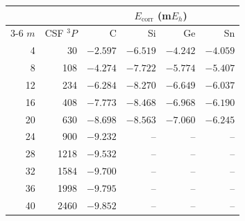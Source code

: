 \begin{tabular}{rrrrrr}
    \toprule
     &  & \multicolumn{4}{c}{$E_{\text{corr}}$ (m$E_h$)} \\
    \cmidrule(lr){3-6}
    $m$ & CSF $^3P$ & C & Si & Ge & Sn \\
    \midrule
    4 & 30 & $-2.597$ & $-6.519$ & $-4.242$ & $-4.059$ \\
    8 & 108 & $-4.274$ & $-7.722$ & $-5.774$ & $-5.407$ \\
    12 & 234 & $-6.284$ & $-8.270$ & $-6.649$ & $-6.037$ \\
    16 & 408 & $-7.773$ & $-8.468$ & $-6.968$ & $-6.190$ \\
    20 & 630 & $-8.698$ & $-8.563$ & $-7.060$ & $-6.245$ \\
    24 & 900 & $-9.232$ & -- & -- & -- \\
    28 & 1218 & $-9.532$ & -- & -- & -- \\
    32 & 1584 & $-9.700$ & -- & -- & -- \\
    36 & 1998 & $-9.795$ & -- & -- & -- \\
    40 & 2460 & $-9.852$ & -- & -- & -- \\
    \bottomrule
\end{tabular}
